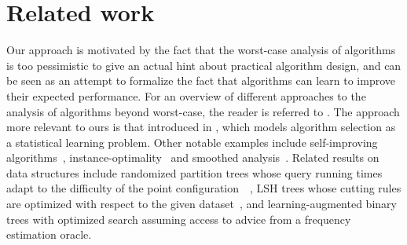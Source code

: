 \section{Related work}
Our approach is motivated by the fact that the worst-case analysis of algorithms is too pessimistic to give an actual hint about practical algorithm design, and   
can be seen as an attempt to formalize the fact that algorithms can learn to improve their expected performance. For an overview of different approaches to the analysis of algorithms beyond worst-case, the reader is referred to \cite{R21}. The approach more relevant to ours is that introduced in \cite{GR17}, which models algorithm selection as a statistical learning problem. Other notable examples include 
self-improving algorithms~\cite{ACCLMS11}, instance-optimality~\cite{ABC17} and smoothed analysis~\cite{ST09}. Related results on data structures include randomized partition trees whose query running times adapt to the difficulty of the point configuration~~\cite{DS15}, LSH trees whose cutting rules are optimized with respect to the given dataset~\cite{AB22}, and learning-augmented binary trees with optimized search assuming access to advice from a frequency estimation oracle.